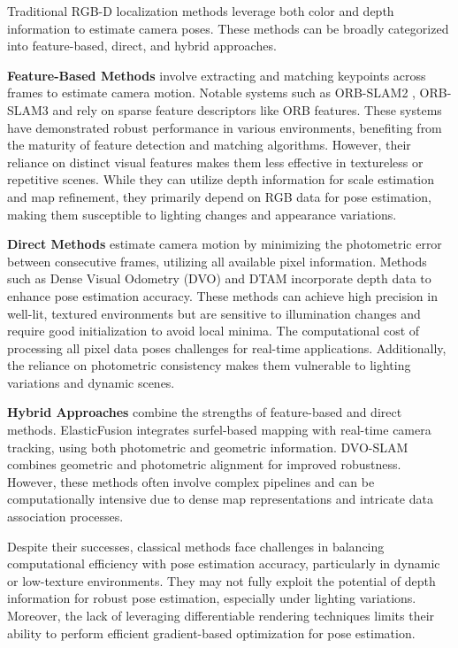 \documentclass[twocolumn]{article} %
\begin{document}
Traditional RGB-D localization methods leverage both color and depth
information to estimate camera poses. These methods can be broadly
categorized into feature-based, direct, and hybrid approaches.

\textbf{Feature-Based Methods} involve extracting and matching keypoints
across frames to estimate camera motion. Notable systems such as
ORB-SLAM2 \cite{mur-artalOrbslam2OpensourceSlam2017} , ORB-SLAM3
\cite{camposOrbslam3AccurateOpensource2021} and
\cite{gauglitzEvaluationInterestPoint2011} rely on sparse feature
descriptors like ORB features. These systems have demonstrated robust
performance in various environments, benefiting from the maturity of
feature detection and matching algorithms. However, their reliance on
distinct visual features makes them less effective in textureless or
repetitive scenes. While they can utilize depth information for scale
estimation and map refinement, they primarily depend on RGB data for
pose estimation, making them susceptible to lighting changes and
appearance variations.

\textbf{Direct Methods}\cite{engelDirectSparseOdometry2017} estimate
camera motion by minimizing the photometric error between consecutive
frames, utilizing all available pixel information. Methods such as Dense
Visual Odometry (DVO)
\cite{kerlDenseVisualSLAM2013,kerlRobustOdometryEstimation2013} and
DTAM\cite{newcombeDTAMDenseTracking2011} incorporate depth data to
enhance pose estimation accuracy. These methods can achieve high
precision in well-lit, textured environments but are sensitive to
illumination changes and require good initialization to avoid local
minima. The computational cost of processing all pixel data poses
challenges for real-time applications. Additionally, the reliance on
photometric consistency makes them vulnerable to lighting variations and
dynamic scenes.

\textbf{Hybrid Approaches} combine the strengths of feature-based and
direct methods. ElasticFusion
\cite{whelanElasticFusionRealtimeDense2016} integrates surfel-based
mapping with real-time camera tracking, using both photometric and
geometric information. DVO-SLAM
\cite{kerlRobustOdometryEstimation2013} combines geometric and
photometric alignment for improved robustness. However, these methods
often involve complex pipelines and can be computationally intensive due
to dense map representations and intricate data association processes.

Despite their successes, classical methods face challenges in balancing
computational efficiency with pose estimation accuracy, particularly in
dynamic or low-texture environments. They may not fully exploit the
potential of depth information for robust pose estimation, especially
under lighting variations. Moreover, the lack of leveraging
differentiable rendering techniques limits their ability to perform
efficient gradient-based optimization for pose estimation.
\end{document}
